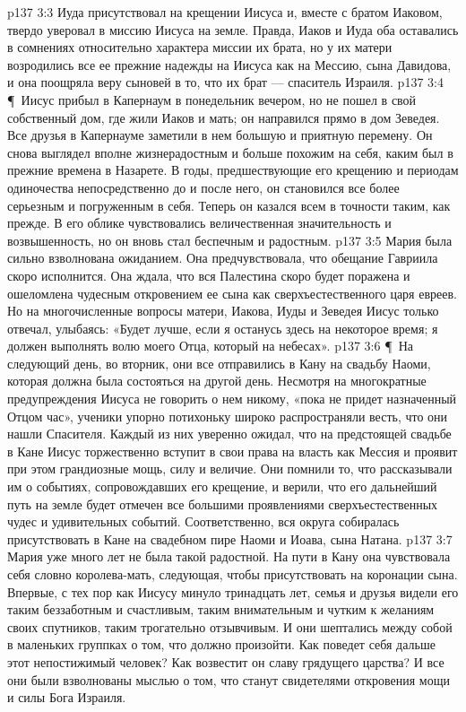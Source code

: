 \vs p137 3:3 Иуда присутствовал на крещении Иисуса и, вместе с братом Иаковом, твердо уверовал в миссию Иисуса на земле. Правда, Иаков и Иуда оба оставались в сомнениях относительно характера миссии их брата, но у их матери возродились все ее прежние надежды на Иисуса как на Мессию, сына Давидова, и она поощряла веру сыновей в то, что их брат --- спаситель Израиля.
\vs p137 3:4 \P\ Иисус прибыл в Капернаум в понедельник вечером, но не пошел в свой собственный дом, где жили Иаков и мать; он направился прямо в дом Зеведея. Все друзья в Капернауме заметили в нем большую и приятную перемену. Он снова выглядел вполне жизнерадостным и больше похожим на себя, каким был в прежние времена в Назарете. В годы, предшествующие его крещению и периодам одиночества непосредственно до и после него, он становился все более серьезным и погруженным в себя. Теперь он казался всем в точности таким, как прежде. В его облике чувствовались величественная значительность и возвышенность, но он вновь стал беспечным и радостным.
\vs p137 3:5 Мария была сильно взволнована ожиданием. Она предчувствовала, что обещание Гавриила скоро исполнится. Она ждала, что вся Палестина скоро будет поражена и ошеломлена чудесным откровением ее сына как сверхъестественного царя евреев. Но на многочисленные вопросы матери, Иакова, Иуды и Зеведея Иисус только отвечал, улыбаясь: «Будет лучше, если я останусь здесь на некоторое время; я должен выполнять волю моего Отца, который на небесах».
\vs p137 3:6 \P\ На следующий день, во вторник, они все отправились в Кану на свадьбу Наоми, которая должна была состояться на другой день. Несмотря на многократные предупреждения Иисуса не говорить о нем никому, «пока не придет назначенный Отцом час», ученики упорно потихоньку широко распространяли весть, что они нашли Спасителя. Каждый из них уверенно ожидал, что на предстоящей свадьбе в Кане Иисус торжественно вступит в свои права на власть как Мессия и проявит при этом грандиозные мощь, силу и величие. Они помнили то, что рассказывали им о событиях, сопровождавших его крещение, и верили, что его дальнейший путь на земле будет отмечен все большими проявлениями сверхъестественных чудес и удивительных событий. Соответственно, вся округа собиралась присутствовать в Кане на свадебном пире Наоми и Иоава, сына Натана.
\vs p137 3:7 Мария уже много лет не была такой радостной. На пути в Кану она чувствовала себя словно королева\hyp{}мать, следующая, чтобы присутствовать на коронации сына. Впервые, с тех пор как Иисусу минуло тринадцать лет, семья и друзья видели его таким беззаботным и счастливым, таким внимательным и чутким к желаниям своих спутников, таким трогательно отзывчивым. И они шептались между собой в маленьких группках о том, что должно произойти. Как поведет себя дальше этот непостижимый человек? Как возвестит он славу грядущего царства? И все они были взволнованы мыслью о том, что станут свидетелями откровения мощи и силы Бога Израиля.
